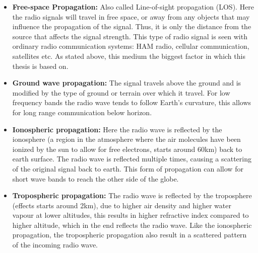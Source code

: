 \begin{itemize}
  \item \textbf{Free-space Propagation:} Also called Line-of-sight propagation (LOS). Here the radio signals will travel in free space, or away from any objects that may influence the propagation of the signal. Thus, it is only the distance from the source that affects the signal strength. This type of radio signal is seen with ordinary radio communication systems: HAM radio, cellular communication, satellites etc. As stated above, this medium the biggest factor in which this thesis is based on. 
  \item \textbf{Ground wave propagation:} The signal travels above the ground and is modified by the type of ground or terrain over which it travel. For low frequency bands the radio wave tends to follow Earth's curvature, this allows for long range communication below horizon.  
  \item \textbf{Ionospheric propagation:} Here the radio wave is reflected by the ionosphere (a region in the atmosphere where the air molecules have been ionized by the sun to allow for free electrons, starts around 60km) back to earth surface. The radio wave is reflected multiple times, causing a scattering of the original signal back to earth. This form of propagation can allow for short wave bands to reach the other side of the globe.
  \item \textbf{Tropospheric propagation:} The radio wave is reflected by the troposphere (effects starts around 2km), due to higher air density and higher water vapour at lower altitudes, this results in higher refractive index compared to higher altitude, which in the end reflects the radio wave. Like the ionospheric propagation, the tropospheric propagation also result in a scattered pattern of the incoming radio wave. 
\end{itemize}

